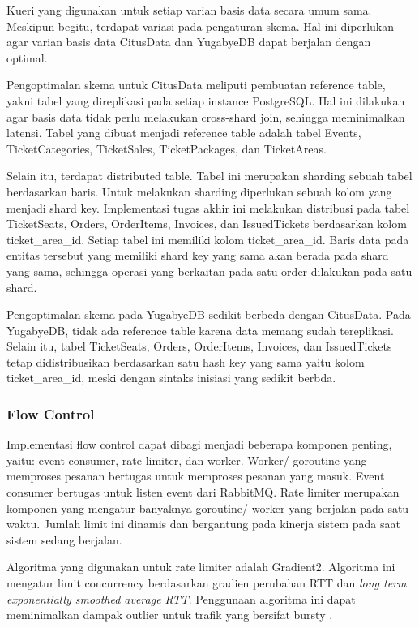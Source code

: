 Kueri yang digunakan untuk setiap varian basis data secara umum sama. Meskipun begitu, terdapat variasi pada pengaturan skema. Hal ini diperlukan agar varian basis data CitusData dan YugabyeDB dapat berjalan dengan optimal.

Pengoptimalan skema untuk CitusData meliputi pembuatan reference table, yakni tabel yang direplikasi pada setiap instance PostgreSQL. Hal ini dilakukan agar basis data tidak perlu melakukan cross-shard join, sehingga meminimalkan latensi. Tabel yang dibuat menjadi reference table adalah tabel Events, TicketCategories, TicketSales, TicketPackages, dan TicketAreas.

Selain itu, terdapat distributed table. Tabel ini merupakan sharding sebuah tabel berdasarkan baris. Untuk melakukan sharding diperlukan sebuah kolom yang menjadi shard key. Implementasi tugas akhir ini melakukan distribusi pada tabel TicketSeats, Orders, OrderItems, Invoices, dan IssuedTickets berdasarkan kolom ticket\_area\_id. Setiap tabel ini memiliki kolom ticket\_area\_id. Baris data pada entitas tersebut yang memiliki shard key yang sama akan berada pada shard yang sama, sehingga operasi yang berkaitan pada satu order dilakukan pada satu shard.

Pengoptimalan skema pada YugabyeDB sedikit berbeda dengan CitusData. Pada YugabyeDB, tidak ada reference table karena data memang sudah tereplikasi. Selain itu, tabel TicketSeats, Orders, OrderItems, Invoices, dan IssuedTickets tetap didistribusikan berdasarkan satu hash key yang sama yaitu kolom ticket\_area\_id, meski dengan sintaks inisiasi yang sedikit berbda.

\subsubsection{Flow Control}

Implementasi flow control dapat dibagi menjadi beberapa komponen penting, yaitu: event consumer, rate limiter, dan worker. Worker/ goroutine yang memproses pesanan bertugas untuk memproses pesanan yang masuk. Event consumer bertugas untuk listen event dari RabbitMQ. Rate limiter merupakan komponen yang mengatur banyaknya goroutine/ worker yang berjalan pada satu waktu. Jumlah limit ini dinamis dan bergantung pada kinerja sistem pada saat sistem sedang berjalan.

Algoritma yang digunakan untuk rate limiter adalah Gradient2. Algoritma ini mengatur limit concurrency berdasarkan gradien perubahan RTT dan \textit{long term exponentially smoothed average RTT}. Penggunaan algoritma ini dapat meminimalkan dampak outlier untuk trafik yang bersifat bursty \parencite{platinummonkey_go_concurrency_limits}.